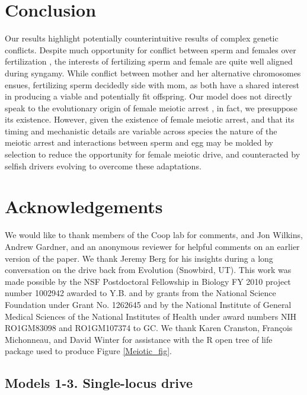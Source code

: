 \documentclass[12pt,letterpaper]{article}
\begin{document}
\section*{Conclusion}
Our results highlight potentially counterintuitive results of complex genetic conflicts. 
Despite much opportunity for conflict between sperm and females over fertilization \citep{Partridge1998},
	the interests of fertilizing sperm and female are quite well aligned during syngamy.
While conflict between mother and her alternative chromosomes ensues, 
	fertilizing sperm decidedly side with mom, as both have a shared interest in producing a viable and potentially fit offspring. 
Our model does not directly speak to the evolutionary origin of
  female meiotic arrest \citep[for a review and evaluation of such
  hypotheses see][]{Mira1998}, in fact, we presuppose its existence.
However, given the existence of female meiotic arrest, 
	and that its timing and mechanistic details are variable
        across species \citep[Figure \ref{Meiotic_fig}, and] []{Masui_book,Karrbook:09}
	the nature of the meiotic arrest and interactions between
        sperm and egg may  be molded by selection to reduce the opportunity for female meiotic drive, 
	and counteracted by selfish drivers evolving to overcome these adaptations. 

\newpage 
\section*{Acknowledgements}
We would like to thank members of the Coop lab for comments, and Jon
Wilkins, Andrew Gardner, and an anonymous reviewer for helpful
comments on an earlier version of the paper. We thank Jeremy Berg for
his insights during a long conversation on the drive back from
Evolution (Snowbird, UT). This work
was made possible by the NSF Postdoctoral Fellowship in Biology FY
2010 project number 1002942 awarded to Y.B. and by grants from the
National Science Foundation under Grant No. 1262645 and by the
National Institute of General Medical Sciences of the National
Institutes of Health under award numbers NIH RO1GM83098 and
RO1GM107374 to GC. We thank Karen Cranston, Fran\c{c}ois Michonneau,
and David Winter for assistance with the R open tree of life package
used to produce Figure \ref{Meiotic_fig}. %

\newpage 

\newpage 
  \appendix


\subsection*{Models 1-3. Single-locus drive}
\end{document}

